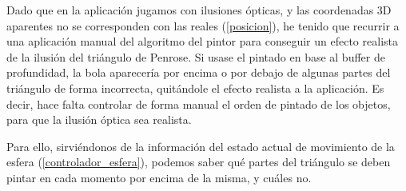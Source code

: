 \documentclass[a4paper,12pt]{article}
\begin{document}
Dado que en la aplicación jugamos con ilusiones ópticas, y las coordenadas 3D aparentes no se corresponden con las reales (\ref{posicion}), he tenido que recurrir a una aplicación manual del algoritmo del pintor para conseguir un efecto realista de la ilusión del triángulo de Penrose. Si usase el pintado en base al buffer de profundidad, la bola aparecería por encima o por debajo de algunas partes del triángulo de forma incorrecta, quitándole el efecto realista a la aplicación. Es decir, hace falta controlar de forma manual el orden de pintado de los objetos, para que la ilusión óptica sea realista.

Para ello, sirviéndonos de la información del estado actual de movimiento de la esfera (\ref{controlador_esfera}), podemos saber qué partes del triángulo se deben pintar en cada momento por encima de la misma, y cuáles no.
\end{document}
